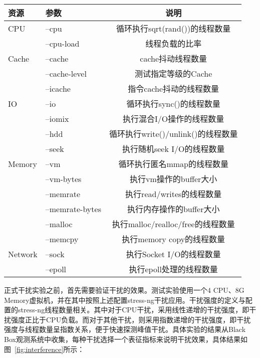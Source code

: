 \begin{table}[H]
    \centering
    \footnotesize%
    \setlength{\tabcolsep}{20pt}%
    \renewcommand{\arraystretch}{1.25}%
    \label{tab:arg_list}
    \begin{tabular}{llc}
        \hline
        资源 & 参数 & 说明\\
        \hline
        CPU	    & --cpu & 循环执行sqrt(rand())的线程数量\\
	            & --cpu-load & 线程负载的比率\\
        Cache	& --cache & cache抖动线程数量\\
	            & --cache-level	&测试指定等级的Cache\\
	            & --icache	&指令cache抖动的线程数量\\
        IO	    & --io	&循环执行sync()的线程数量\\
	            & --iomix	&执行混合I/O操作的线程数量\\
	            & --hdd	&循环执行write()/unlink()的线程数量\\
	            & --seek	&执行随机seek I/O的线程数量\\
        Memory	& --vm	&循环执行匿名mmap的线程数量\\
	            & --vm-bytes	&执行vm操作的buffer大小\\
	            & --memrate	&执行read/writes的线程数量\\
	            & --memrate-bytes	&执行内存操作的buffer大小\\
	            & --malloc	&执行malloc/realloc/free的线程数量\\
	            & --memcpy	&执行memory copy的线程数量\\
        Network	& --sock	&执行Socket I/O的线程数量\\
	            & --epoll	&执行epoll处理的线程数量\\
        \hline
    \end{tabular}
\end{table}

正式干扰实验之前，首先需要验证干扰的效果。测试实验使用一个4 CPU、8G Memory虚拟机，并在其中按照上述配置stress-ng干扰应用。干扰强度的定义与配置的stress-ng线程数量相关。其中对于CPU干扰，采用线性递增的干扰强度，即干扰强度正比于CPU负载。而对于其他干扰，则采用指数递增的干扰强度，即干扰强度与线程数量呈指数关系，便于快速探测峰值干扰。具体实验的结果从Black Box观测系统中收集，每种干扰选择一个表征指标来说明干扰效果，具体结果如图~\ref{fig:interference}所示：

